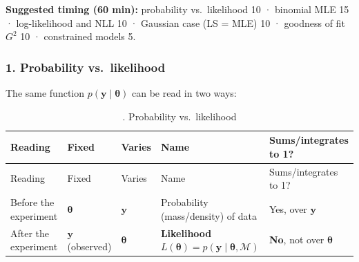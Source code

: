 \textbf{Suggested timing (60 min):} probability vs.~likelihood 10 ·
binomial MLE 15 · log-likelihood and NLL 10 · Gaussian case (LS = MLE)
10 · goodness of fit \(G^2\) 10 · constrained models 5.

\subsubsection{1. Probability vs.~likelihood}

The same function \(p(\mathbf{y}\mid\boldsymbol\theta)\) can be read in
two ways:

\begin{longtable}[]{@{}
  >{\raggedright\arraybackslash}p{}
  >{\raggedright\arraybackslash}p{}
  >{\raggedright\arraybackslash}p{}
  >{\raggedright\arraybackslash}p{}
  >{\raggedright\arraybackslash}p{}@{}}
\caption{. Probability vs.~likelihood}\tabularnewline
\toprule\noalign{}
\begin{minipage}[b]{\linewidth}\raggedright
Reading
\end{minipage} & \begin{minipage}[b]{\linewidth}\raggedright
Fixed
\end{minipage} & \begin{minipage}[b]{\linewidth}\raggedright
Varies
\end{minipage} & \begin{minipage}[b]{\linewidth}\raggedright
Name
\end{minipage} & \begin{minipage}[b]{\linewidth}\raggedright
Sums/integrates to 1?
\end{minipage} \\
\midrule\noalign{}
\endfirsthead
\toprule\noalign{}
\begin{minipage}[b]{\linewidth}\raggedright
Reading
\end{minipage} & \begin{minipage}[b]{\linewidth}\raggedright
Fixed
\end{minipage} & \begin{minipage}[b]{\linewidth}\raggedright
Varies
\end{minipage} & \begin{minipage}[b]{\linewidth}\raggedright
Name
\end{minipage} & \begin{minipage}[b]{\linewidth}\raggedright
Sums/integrates to 1?
\end{minipage} \\
\midrule\noalign{}
\endhead
\bottomrule\noalign{}
\endlastfoot
Before the experiment & \(\boldsymbol\theta\) & \(\mathbf{y}\) &
Probability (mass/density) of data & Yes, over \(\mathbf{y}\) \\
After the experiment & \(\mathbf{y}\) (observed) & \(\boldsymbol\theta\)
& \textbf{Likelihood}
\(L(\boldsymbol\theta) = p(\mathbf{y}\mid\boldsymbol\theta,\mathcal{M})\)
& \textbf{No}, not over \(\boldsymbol\theta\) \\
\end{longtable}

